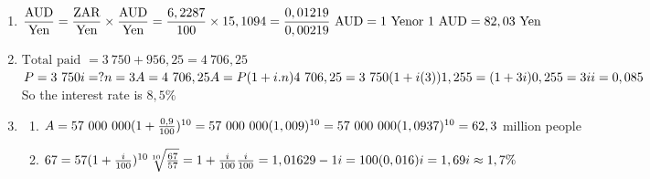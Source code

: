 \begin{eocsolutions}{}
{\begin{enumerate}[itemsep=5pt, label=\textbf{\arabic*}. ]
\item $\dfrac{\mbox{AUD}}{\mbox{Yen}}=\dfrac{\mbox{ZAR}}{\mbox{Yen}} \times \dfrac{\mbox{AUD}}{\mbox{Yen}} \\[4pt]
= \dfrac{6,2287}{100} \times 15,1094 \\[4pt]
= \dfrac{0,01219}{0,00219} \mbox{ AUD} \\[4pt]
= 1 \mbox{ Yen} \\
\mbox{or } 1 \mbox{ AUD} = 82,03 \mbox{ Yen}$
\item $\mbox{Total paid } = 3~750 + 956,25 = 4~706,25$\\
$P=3~750\\
i=?\\
n=3\\
A=4~706,25\\
 A=P(1 + i . n) \\
4~706,25 = 3~750(1+ i(3))\\
1,255 = (1 + 3i)\\
0,255 = 3i \\
i = 0,085$\\
So the interest rate is $8,5 \%$

\item
\begin{enumerate}[noitemsep, label=\textbf{(\alph*)} ]
    \item $A = 57~000~000 (1 + \frac{0,9}{100})^{10}\\
	     = 57~000~000 (1,009)^{10}\\
	     = 57~000~000 (1,0937)^{10}\\
	     = 62,3$ million people
    \item $67 = 57 (1 + \frac{i}{100})^{10}\\
\sqrt[10]{\frac{67}{57}} = 1 + \frac{i}{100}\\
	\frac{i}{100} = 1,01629 - 1\\
	    i = 100 (0,016)\\
	    i = 1,69\\
	    i \approx 1,7\%$
\end{enumerate}
\end{enumerate}}
\end{eocsolutions}


